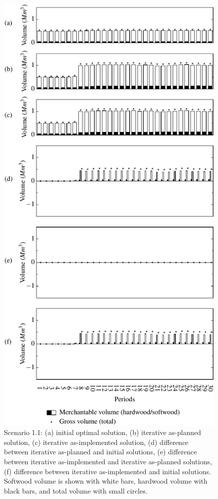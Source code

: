 \begin{figure}[ht!]
  \caption{Scenario 1.1: (a) initial optimal solution, (b) iterative
    as-planned solution, (c) iterative as-implemented solution, (d)
    difference between iterative as-planned and initial solutions, (e)
    difference between iterative as-implemented and iterative
    as-planned solutions, (f) difference between iterative
    as-implemented and initial solutions. Softwood volume is shown
    with white bars, hardwood volume with black bars, and total volume
    with small circles.}
  \label{fig:scenario1.1}
  \medskip
  \centering
  \includegraphics[width=0.6\columnwidth]{images/s2-1a}
\end{figure}

